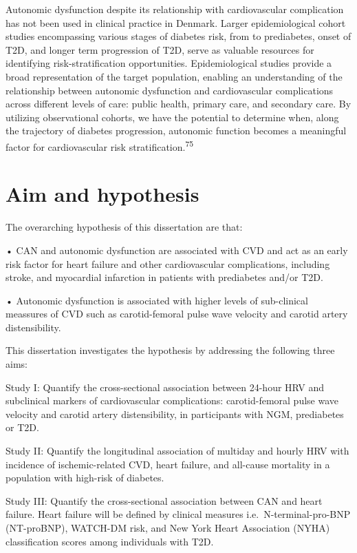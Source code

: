 \documentclass[
  letterpaper,
  headsepline=true,
  open=any]{scrbook}
\begin{document}
Autonomic dysfunction despite its relationship with cardiovascular
complication has not been used in clinical practice in Denmark. Larger
epidemiological cohort studies encompassing various stages of diabetes
risk, from to prediabetes, onset of T2D, and longer term progression of
T2D, serve as valuable resources for identifying risk-stratification
opportunities. Epidemiological studies provide a broad representation of
the target population, enabling an understanding of the relationship
between autonomic dysfunction and cardiovascular complications across
different levels of care: public health, primary care, and secondary
care. By utilizing observational cohorts, we have the potential to
determine when, along the trajectory of diabetes progression, autonomic
function becomes a meaningful factor for cardiovascular risk
stratification.\textsuperscript{75}


\hypertarget{aim-and-hypothesis}{%
\chapter{Aim and hypothesis}\label{aim-and-hypothesis}}

\newpage

The overarching hypothesis of this dissertation are that:

• CAN and autonomic dysfunction are associated with CVD and act as an
early risk factor for heart failure and other cardiovascular
complications, including stroke, and myocardial infarction in patients
with prediabetes and/or T2D.

• Autonomic dysfunction is associated with higher levels of sub-clinical
meassures of CVD such as carotid-femoral pulse wave velocity and carotid
artery distensibility.

This dissertation investigates the hypothesis by addressing the
following three aims:

Study I: Quantify the cross-sectional association between 24-hour HRV
and subclinical markers of cardiovascular complications: carotid-femoral
pulse wave velocity and carotid artery distensibility, in participants
with NGM, prediabetes or T2D.

Study II: Quantify the longitudinal association of multiday and hourly
HRV with incidence of ischemic-related CVD, heart failure, and all-cause
mortality in a population with high-risk of diabetes.

Study III: Quantify the cross-sectional association between CAN and
heart failure. Heart failure will be defined by clinical measures
i.e.~N-terminal-pro-BNP (NT-proBNP), WATCH-DM risk, and New York Heart
Association (NYHA) classification scores among individuals with T2D.
\end{document}
